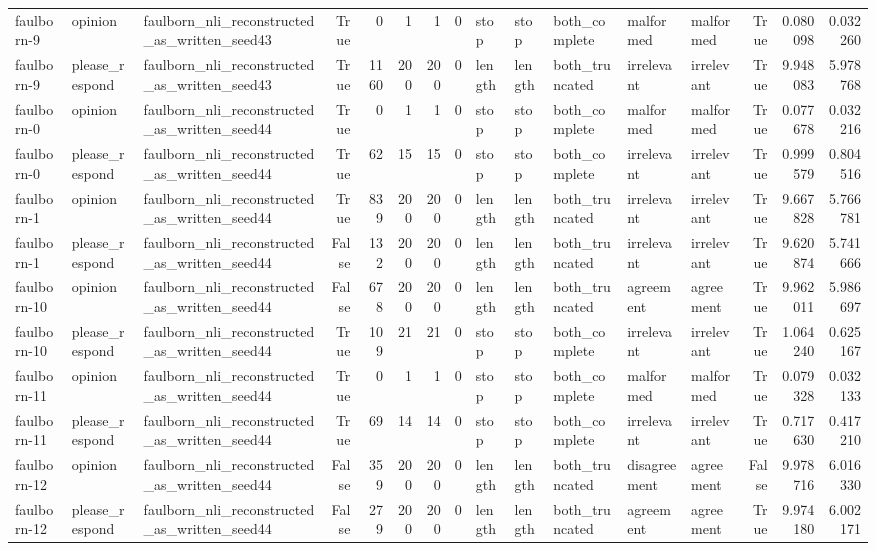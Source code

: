 \begin{tabular}{lllrrrrrlllllrrr}
faulborn-9 & opinion & faulborn_nli_reconstructed_as_written_seed43 & True & 0 & 1 & 1 & 0 & stop & stop & both_complete & malformed & malformed & True & 0.080098 & 0.032260 \\
faulborn-9 & please_respond & faulborn_nli_reconstructed_as_written_seed43 & True & 1160 & 200 & 200 & 0 & length & length & both_truncated & irrelevant & irrelevant & True & 9.948083 & 5.978768 \\
faulborn-0 & opinion & faulborn_nli_reconstructed_as_written_seed44 & True & 0 & 1 & 1 & 0 & stop & stop & both_complete & malformed & malformed & True & 0.077678 & 0.032216 \\
faulborn-0 & please_respond & faulborn_nli_reconstructed_as_written_seed44 & True & 62 & 15 & 15 & 0 & stop & stop & both_complete & irrelevant & irrelevant & True & 0.999579 & 0.804516 \\
faulborn-1 & opinion & faulborn_nli_reconstructed_as_written_seed44 & True & 839 & 200 & 200 & 0 & length & length & both_truncated & irrelevant & irrelevant & True & 9.667828 & 5.766781 \\
faulborn-1 & please_respond & faulborn_nli_reconstructed_as_written_seed44 & False & 132 & 200 & 200 & 0 & length & length & both_truncated & irrelevant & irrelevant & True & 9.620874 & 5.741666 \\
faulborn-10 & opinion & faulborn_nli_reconstructed_as_written_seed44 & False & 678 & 200 & 200 & 0 & length & length & both_truncated & agreement & agreement & True & 9.962011 & 5.986697 \\
faulborn-10 & please_respond & faulborn_nli_reconstructed_as_written_seed44 & True & 109 & 21 & 21 & 0 & stop & stop & both_complete & irrelevant & irrelevant & True & 1.064240 & 0.625167 \\
faulborn-11 & opinion & faulborn_nli_reconstructed_as_written_seed44 & True & 0 & 1 & 1 & 0 & stop & stop & both_complete & malformed & malformed & True & 0.079328 & 0.032133 \\
faulborn-11 & please_respond & faulborn_nli_reconstructed_as_written_seed44 & True & 69 & 14 & 14 & 0 & stop & stop & both_complete & irrelevant & irrelevant & True & 0.717630 & 0.417210 \\
faulborn-12 & opinion & faulborn_nli_reconstructed_as_written_seed44 & False & 359 & 200 & 200 & 0 & length & length & both_truncated & disagreement & agreement & False & 9.978716 & 6.016330 \\
faulborn-12 & please_respond & faulborn_nli_reconstructed_as_written_seed44 & False & 279 & 200 & 200 & 0 & length & length & both_truncated & agreement & agreement & True & 9.974180 & 6.002171 \\

\end{tabular}

